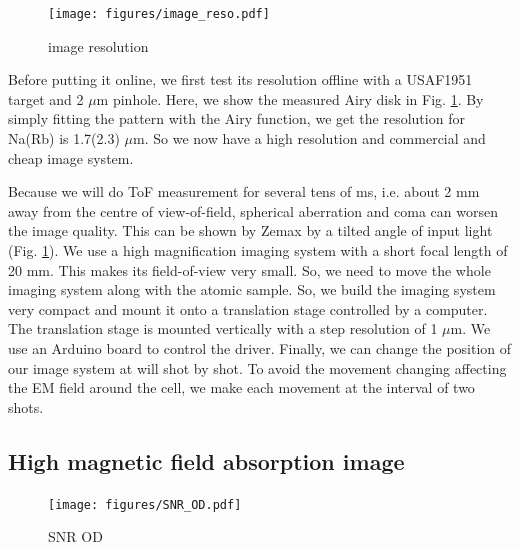\begin{figure}[htb]
\begin{center}
\texttt{[image: figures/image\_reso.pdf]}
\end{center}
\caption[Test of image resolution of 15x image system]{image resolution}
\label{image_reso}
\end{figure}

Before putting it online, we first test its resolution offline with a USAF1951 target and 2 $\mu$m pinhole. Here, we show the measured Airy disk in Fig. \ref{image_reso}. By simply fitting the pattern with the Airy function, we get the resolution for Na(Rb) is 1.7(2.3) $\mu$m. So we now have a high resolution and commercial and cheap image system. 

Because we will do ToF measurement for several tens of ms, i.e. about 2 mm away from the centre of view-of-field, spherical aberration and coma can worsen the image quality. This can be shown by Zemax by a tilted angle of input light (Fig. \ref{image_reso}). We use a high magnification imaging system with a short focal length of 20 mm. This makes its field-of-view very small. So, we need to move the whole imaging system along with the atomic sample. So, we build the imaging system very compact and mount it onto a translation stage controlled by a computer. The translation stage is mounted vertically with a step resolution of 1 $\mu$m. We use an Arduino board to control the driver. Finally, we can change the position of our image system at will shot by shot. To avoid the movement changing affecting the EM field around the cell, we make each movement at the interval of two shots.

\subsection{High magnetic field absorption image}

\begin{figure}[htb]
\begin{center}
\texttt{[image: figures/SNR\_OD.pdf]}
\end{center}
\caption[SNR OD]{SNR OD}
\label{SNR_OD}
\end{figure}

